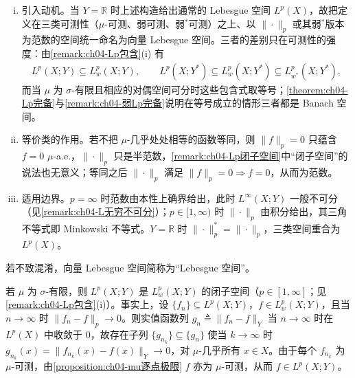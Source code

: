 \documentclass[../../main.tex]{subfiles}%
\begin{document}
\begin{remark}
\begin{enumerate}[(i)]
\item 引入动机。当 $Y=\mathbb{R}$ 时上述构造给出通常的 Lebesgue 空间 $L^p(X)$，故把定义在三类可测性（$\mu$-可测、弱可测、弱$^*$可测）之上、以 $\|\cdot\|_p$ 或其弱$^*$版本为范数的空间统一命名为向量 Lebesgue 空间。三者的差别只在可测性的强度：由\cref{remark:ch04-Lp包含}(i) 有
\begin{align*}
L^p(X;Y)\subseteq L^p_w(X;Y),\qquad L^p(X;Y^*)\subseteq L^p_w(X;Y^*)\subseteq L^p_{w^*}(X;Y^*),
\end{align*}
而当 $\mu$ 为 $\sigma$-有限且相应的对偶空间可分时这些包含式取等号；\cref{theorem:ch04-Lp完备}与\cref{remark:ch04-弱Lp完备}说明在等号成立的情形三者都是 Banach 空间。

\item 等价类的作用。若不把 $\mu$-几乎处处相等的函数等同，则 $\|f\|_p=0$ 只蕴含 $f=0$ $\mu$-a.e.，$\|\cdot\|_p$ 只是半范数，\cref{remark:ch04-Lp闭子空间}中“闭子空间”的说法也无意义；等同之后 $\|\cdot\|_p$ 满足 $\|f\|_p=0\Rightarrow f=0$，从而为范数。

\item 适用边界。$p=\infty$ 时范数由本性上确界给出，此时 $L^\infty(X;Y)$ 一般不可分（见\cref{remark:ch04-L无穷不可分}）；$p\in[1,\infty)$ 时 $\|\cdot\|_p$ 由积分给出，其三角不等式即 Minkowski 不等式。$Y=\mathbb{R}$ 时 $\|\cdot\|_p^*=\|\cdot\|_p$，三类空间重合为 $L^p(X)$。
\end{enumerate}
\end{remark}

若不致混淆，向量 Lebesgue 空间简称为“Lebesgue 空间”。

\begin{remark}\label{remark:ch04-Lp闭子空间}
若 $\mu$ 为 $\sigma$-有限，则 $L^p(X;Y)$ 是 $L^p_w(X;Y)$ 的闭子空间（$p\in[1,\infty]$；见\cref{remark:ch04-Lp包含}(i)）。事实上，设 $\{f_n\}\subseteq L^p(X;Y)$，$f\in L^p_w(X;Y)$，且当 $n\to\infty$ 时 $\|f_n-f\|_p\to0$。则实值函数列 $g_n\triangleq \|f_n-f\|_Y$ 当 $n\to\infty$ 时在 $L^p(X)$ 中收敛于 $0$，故存在子列 $\{g_{n_k}\}\subseteq\{g_n\}$ 使当 $k\to\infty$ 时 $g_{n_k}(x)=\|f_{n_k}(x)-f(x)\|_Y\to0$，对 $\mu$-几乎所有 $x\in X$。由于每个 $f_{n_k}$ 为 $\mu$-可测，由\cref{proposition:ch04-mu逐点极限} $f$ 亦为 $\mu$-可测，从而 $f\in L^p(X;Y)$。
\end{remark}
\end{document}
